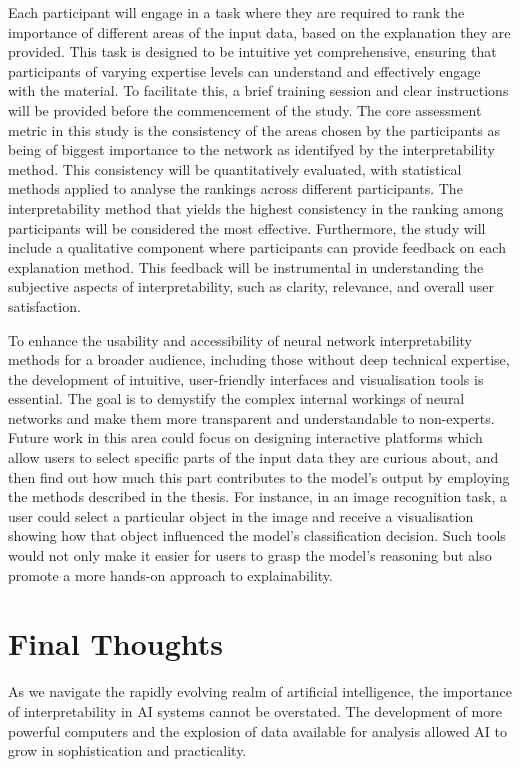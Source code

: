 Each participant will engage in a task where they are required to rank the importance of different areas of the input data, based on the explanation they are provided. This task is designed to be intuitive yet comprehensive, ensuring that participants of varying expertise levels can understand and effectively engage with the material. To facilitate this, a brief training session and clear instructions will be provided before the commencement of the study. The core assessment metric in this study is the consistency of the areas chosen by the participants as being of biggest importance to the network as identifyed by the interpretability method. This consistency will be quantitatively evaluated, with statistical methods applied to analyse the rankings across different participants. The interpretability method that yields the highest consistency in the ranking among participants will be considered the most effective. Furthermore, the study will include a qualitative component where participants can provide feedback on each explanation method. This feedback will be instrumental in understanding the subjective aspects of interpretability, such as clarity, relevance, and overall user satisfaction. 


To enhance the usability and accessibility of neural network interpretability methods for a broader audience, including those without deep technical expertise, the development of intuitive, user-friendly interfaces and visualisation tools is essential. The goal is to demystify the complex internal workings of neural networks and make them more transparent and understandable to non-experts. Future work in this area could focus on designing interactive platforms which allow users to select specific parts of the input data they are curious about, and then find out how much this part contributes to the model's output by employing the methods described in the thesis. For instance, in an image recognition task, a user could select a particular object in the image and receive a visualisation showing how that object influenced the model's classification decision. Such tools would not only make it easier for users to grasp the model's reasoning but also promote a more hands-on approach to explainability.



\section{Final Thoughts}
As we navigate the rapidly evolving realm of artificial intelligence, the importance of interpretability in AI systems cannot be overstated. The development of more powerful computers and the explosion of data available for analysis allowed AI to grow in sophistication and practicality.

